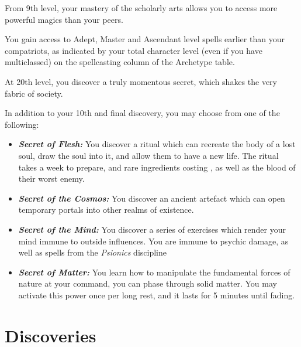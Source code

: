 {
From 9th level, your mastery of the scholarly arts allows you to access more powerful magics than your peers. 

You gain access to Adept, Master and Ascendant level spells earlier than your compatriots, as indicated by your total character level (even if you have multiclassed) on the spellcasting column of the Archetype table. 
}

{
	At 20th level, you discover a truly momentous secret, which shakes the very fabric of society. 
	
	In addition to your 10th and final discovery, you may choose from one of the following:
	
	\newcommand\secret[2]
	{
		\item \textbf{\textit{#1:}} #2
	}
	
	\begin{itemize}
		\secret{Secret of Flesh}{You discover a ritual which can recreate the body of a lost soul, draw the soul into it, and allow them to have a new life. The ritual takes a week to prepare, and rare ingredients costing \galleon{300}, as well as the blood of their worst enemy.}
		\secret{Secret of the Cosmos}{You discover an ancient artefact which can open temporary portals into other realms of existence.}
		\secret{Secret of the Mind}{You discover a series of exercises which render your mind immune to outside influences. You are immune to psychic damage, as well as spells from the {\it Psionics} discipline}
		\secret{Secret of Matter}{You learn how to manipulate the fundamental forces of nature at your command, you can phase through solid matter. You may activate this power once per long rest, and it lasts for 5 minutes until fading.}
	\end{itemize}

}



\section*{Discoveries}

\newcommand\discovery[5]{
\subsubsection{\textit{\textbf{#1}}}
{\setlength\parskip{5 pt}
\if#21
	{\it Prerequisite: #3}
\fi

#4

#5
}
}

